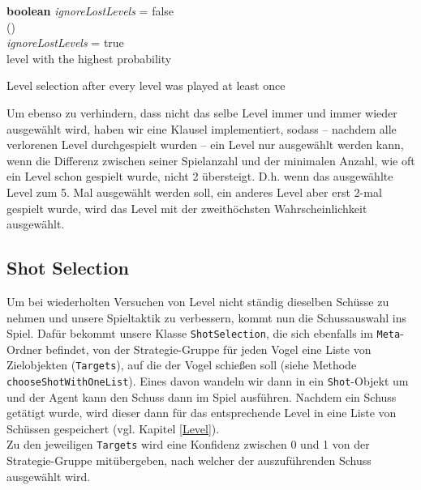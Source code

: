\begin{algorithm}[H]
  \begin{algorithmic}[1]
  	\State \textbf{boolean} \textit{ignoreLostLevels} = false
  	\\
  	\State {}() 
  	\\
  		 		\hspace{\algorithmicindent}  \Return {} 
			\Else  
				\State \textit{ignoreLostLevels} = true
  		 	\EndIf
  		\Else
  			\Return {}
  		\EndIf
  	\EndIf
  	\\
		\Return level with the highest probability  	
  	\EndIf
  \end{algorithmic}
  \caption{Level selection after every level was played at least once \label{lvlSelec}}
\end{algorithm}

Um ebenso zu verhindern, dass nicht das selbe Level immer und immer wieder ausgewählt wird, haben wir eine Klausel implementiert, sodass -- nachdem alle verlorenen Level durchgespielt wurden -- ein Level nur ausgewählt werden kann, wenn die Differenz zwischen seiner Spielanzahl und der minimalen Anzahl, wie oft ein Level schon gespielt wurde, nicht 2 übersteigt. D.h. wenn das ausgewählte Level zum 5. Mal ausgewählt werden soll, ein anderes Level aber erst 2-mal gespielt wurde, wird das Level mit der zweithöchsten Wahrscheinlichkeit ausgewählt.

\subsection{Shot Selection} \label{ShotSelection}
Um bei wiederholten Versuchen von Level nicht ständig dieselben Schüsse zu nehmen und unsere Spieltaktik zu verbessern, kommt nun die Schussauswahl ins Spiel. Dafür bekommt unsere Klasse \texttt{ShotSelection}, die sich ebenfalls im \texttt{Meta}-Ordner befindet, von der Strategie-Gruppe für jeden Vogel eine Liste von Zielobjekten (\texttt{Targets}), auf die der Vogel schie\ss en soll (siehe Methode \texttt{chooseShotWithOneList}). Eines davon wandeln wir dann in ein \texttt{Shot}-Objekt um und der Agent kann den Schuss dann im Spiel ausführen. Nachdem ein Schuss getätigt wurde, wird dieser dann für das entsprechende Level in eine Liste von Schüssen gespeichert (vgl. Kapitel \ref{Level}). \\
Zu den jeweiligen \texttt{Targets} wird eine Konfidenz zwischen 0 und 1 von der Strategie-Gruppe mitübergeben, nach welcher der auszuführenden Schuss ausgewählt wird. 

